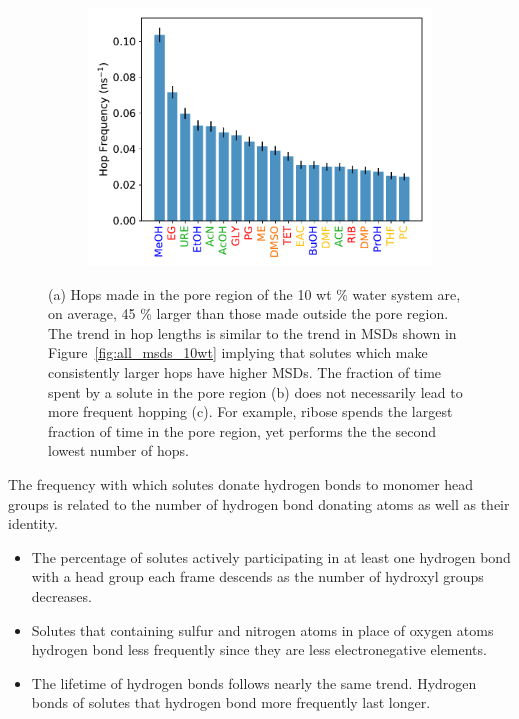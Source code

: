 \documentclass{article}
\begin{document}
\begin{figure}
\begin{subfigure}{0.325\textwidth}
  \includegraphics[width=\textwidth]{hopfreq_total.pdf}
  \caption{}\label{fig:hopfreq}
  \end{subfigure}
  \caption{(a) Hops made in the pore region of the 10 wt \% water system
  are, on average, 45 \% larger than those made outside the pore region.
  The trend in hop lengths is similar to the trend in MSDs shown in
  Figure~\ref{fig:all_msds_10wt} implying that solutes which make consistently
  larger hops have higher MSDs. The fraction of time spent by a solute in the
  pore region (b) does not necessarily lead to more frequent hopping (c). For
  example, ribose spends the largest fraction of time in the pore region, yet
  performs the the second lowest number of hops.}\label{fig:hops}
  \end{figure}
  
  \noindent The frequency with which solutes donate hydrogen bonds to monomer
  head groups is related to the number of hydrogen bond donating atoms as well
  as their identity.
  \begin{itemize}
    \item The percentage of solutes actively participating in at least one
    hydrogen bond with a head group each frame descends as the number of 
    hydroxyl groups decreases.
    \item Solutes that containing sulfur and nitrogen atoms in place of 
    oxygen atoms hydrogen bond less frequently since they are less 
    electronegative elements.
    \item The lifetime of hydrogen bonds follows nearly the same trend. Hydrogen
    bonds of solutes that hydrogen bond more frequently last longer. 
  \end{itemize}
  
\end{document}
